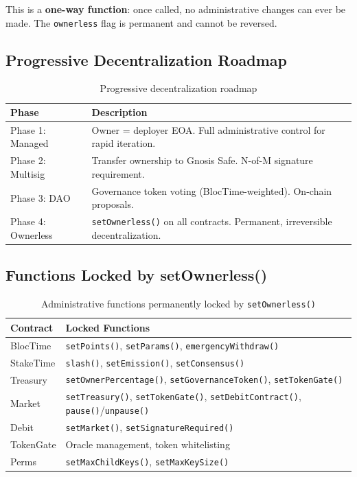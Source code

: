\documentclass[11pt,a4paper]{article}
\begin{document}
This is a \textbf{one-way function}: once called, no administrative changes can ever be made. The \texttt{ownerless} flag is permanent and cannot be reversed.

\subsection{Progressive Decentralization Roadmap}

\begin{table}[H]
\centering
\begin{tabularx}{\textwidth}{lX}
\toprule
\textbf{Phase} & \textbf{Description} \\
\midrule
Phase 1: Managed & Owner = deployer EOA. Full administrative control for rapid iteration. \\
Phase 2: Multisig & Transfer ownership to Gnosis Safe. N-of-M signature requirement. \\
Phase 3: DAO & Governance token voting (BlocTime-weighted). On-chain proposals. \\
Phase 4: Ownerless & \texttt{setOwnerless()} on all contracts. Permanent, irreversible decentralization. \\
\bottomrule
\end{tabularx}
\caption{Progressive decentralization roadmap}
\end{table}

\subsection{Functions Locked by setOwnerless()}

\begin{table}[H]
\centering
\begin{tabularx}{\textwidth}{lX}
\toprule
\textbf{Contract} & \textbf{Locked Functions} \\
\midrule
BlocTime & \texttt{setPoints()}, \texttt{setParams()}, \texttt{emergencyWithdraw()} \\
StakeTime & \texttt{slash()}, \texttt{setEmission()}, \texttt{setConsensus()} \\
Treasury & \texttt{setOwnerPercentage()}, \texttt{setGovernanceToken()}, \texttt{setTokenGate()} \\
Market & \texttt{setTreasury()}, \texttt{setTokenGate()}, \texttt{setDebitContract()}, \texttt{pause()}/\texttt{unpause()} \\
Debit & \texttt{setMarket()}, \texttt{setSignatureRequired()} \\
TokenGate & Oracle management, token whitelisting \\
Perms & \texttt{setMaxChildKeys()}, \texttt{setMaxKeySize()} \\
\bottomrule
\end{tabularx}
\caption{Administrative functions permanently locked by \texttt{setOwnerless()}}
\end{table}
\end{document}

